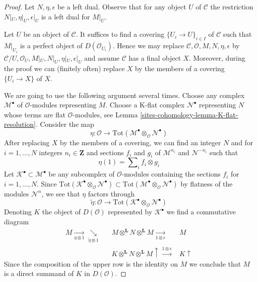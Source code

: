 \begin{proof}
Let $N, \eta, \epsilon$ be a left dual. Observe that for any object
$U$ of $\mathcal{C}$ the restriction $N|_U, \eta|_U, \epsilon|_U$
is a left dual for $M|_U$.

\medskip\noindent
Let $U$ be an object of $\mathcal{C}$. It suffices to find a covering
$\{U_i \to U\}_{i \in I}$ of $\mathcal{C}$ such that $M|_{U_i}$ is
a perfect object of $D(\mathcal{O}_{U_i})$. Hence we may replace
$\mathcal{C}, \mathcal{O}, M, N, \eta, \epsilon$ by
$\mathcal{C}/U, \mathcal{O}_U, M|_U, N|_U, \eta|_U, \epsilon|_U$
and assume $\mathcal{C}$ has a final object $X$. Moreover, during the
proof we can (finitely often) replace $X$ by the members of a
covering $\{U_i \to X\}$ of $X$.

\medskip\noindent
We are going to use the following argument several times. Choose any
complex $\mathcal{M}^\bullet$
of $\mathcal{O}$-modules representing $M$. Choose a K-flat complex
$\mathcal{N}^\bullet$ representing $N$ whose terms are flat
$\mathcal{O}$-modules, see Lemma \ref{sites-cohomology-lemma-K-flat-resolution}.
Consider the map
$$
\eta : \mathcal{O} \to
\text{Tot}(\mathcal{M}^\bullet \otimes_\mathcal{O} \mathcal{N}^\bullet)
$$
After replacing $X$ by the members of a covering,
we can find an integer $N$ and for
$i = 1, \ldots, N$ integers $n_i \in \mathbf{Z}$ and sections
$f_i$ and $g_i$ of $\mathcal{M}^{n_i}$ and $\mathcal{N}^{-n_i}$
such that
$$
\eta(1) = \sum\nolimits_i f_i \otimes g_i
$$
Let $\mathcal{K}^\bullet \subset \mathcal{M}^\bullet$ be any subcomplex
of $\mathcal{O}$-modules containing the sections $f_i$
for $i = 1, \ldots, N$.
Since
$\text{Tot}(\mathcal{K}^\bullet \otimes_\mathcal{O} \mathcal{N}^\bullet)
\subset
\text{Tot}(\mathcal{M}^\bullet \otimes_\mathcal{O} \mathcal{N}^\bullet)$
by flatness of the modules $\mathcal{N}^n$, we see that $\eta$ factors through
$$
\tilde \eta :
\mathcal{O} \to
\text{Tot}(\mathcal{K}^\bullet \otimes_\mathcal{O} \mathcal{N}^\bullet)
$$
Denoting $K$ the object of $D(\mathcal{O})$ represented by
$\mathcal{K}^\bullet$ we find a commutative diagram
$$
\begin{array}{cccc}M \underset{\eta \otimes 1}{\longrightarrow}\underset{\tilde \eta \otimes 1}{\searrow} &  & M \otimes^\mathbf{L} N \otimes^\mathbf{L} M
\underset{1 \otimes \epsilon}{\longrightarrow} & M \\  &  & K \otimes^\mathbf{L} N \otimes^\mathbf{L} M
\uparrow\overset{1 \otimes \epsilon}{\longrightarrow} & K \uparrow\end{array}
$$
Since the composition of the upper row is the identity on $M$
we conclude that $M$ is a direct summand of $K$ in $D(\mathcal{O})$.


\end{proof}
